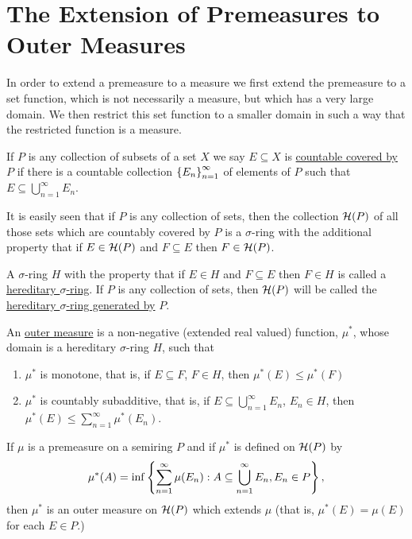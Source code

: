 \section{The Extension of Premeasures to Outer Measures}

In order to extend a premeasure to a measure we first extend the premeasure to a set function, which is not necessarily a measure, but which has a very large domain. We then restrict this set function to a smaller domain in such a way that the restricted function is a measure.

\begin{definition}
If $P$ is any collection of subsets of a set $X$ we say $E\subseteq X$ is \underline{countable covered by} $P$ if there is a countable collection $\left\{E_n\right\}_{n=1}^\infty$ of elements of $P$ such that $E\subseteq\bigcup_{n=1}^\infty E_n$.
\end{definition}

It is easily seen that if $P$ is any collection of sets, then the collection ${\cal H}(P)$ of all those sets which are countably covered by $P$ is a $\sigma$-ring with the additional property that if $E\in{\cal H}(P)$ and $F\subseteq E$ then $F\in{\cal H}(P)$.

\begin{definition}
A $\sigma$-ring $H$ with the property that if $E\in H$ and $F\subseteq E$ then $F\in H$ is called a \underline{hereditary $\sigma$-ring}.
If $P$ is any collection of sets, then ${\cal H}(P)$ will be called the \underline{hereditary $\sigma$-ring generated by} $P$.
\end{definition}

\begin{definition}
An \underline{outer measure} is a non-negative (extended real valued) function, $\mu^*$, whose domain is a hereditary $\sigma$-ring $H$, such that
\begin{enumerate}[label=\arabic*)]
    \item \label{def:outer measure 1}
    $\mu^*$ is monotone, that is, if $E\subseteq F$, $F\in H$, then $\mu^*(E)\leq\mu^*(F)$
    \item \label{def:outer measure 2}
    $\mu^*$ is countably subadditive, that is, if $E\subseteq\bigcup_{n=1}^\infty E_n$, $E_n\in H$, then $\mu^*(E)\leq\sum_{n=1}^\infty\mu^*(E_n)$.
\end{enumerate}
\end{definition}

\begin{theorem}
\label{thm:outer measure of premeasure}
If $\mu$ is a premeasure on a semiring $P$ and if $\mu^*$ is defined on ${\cal H}(P)$ by $$\mu^*(A)=\inf \left\{\sum_{n=1}^\infty\mu(E_n): A\subseteq\bigcup_{n=1}^\infty E_n, E_n \in P\right\},$$ then $\mu^*$ is an outer measure on ${\cal H}(P)$ which extends $\mu$ (that is, $\mu^*(E)=\mu(E)$ for each $E\in P$.)
\end{theorem}

